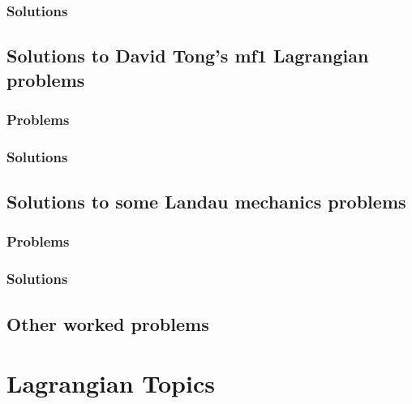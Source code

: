       \section{Solutions}
         \shipoutAnswer
   \chapter{Solutions to David Tong's mf1 Lagrangian problems}
      \section{Problems}
         
      \section{Solutions}
         \shipoutAnswer
   \chapter{Solutions to some Landau mechanics problems}
      \section{Problems}
         
      \section{Solutions}
         \shipoutAnswer
   \chapter{Other worked problems}
      
         \shipoutAnswer

\part{Lagrangian Topics}
   
   
   
   
   
   

